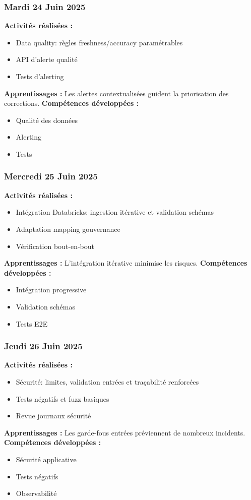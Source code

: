 \documentclass[12pt,a4paper]{article}
\begin{document}
\subsubsection{Mardi 24 Juin 2025}
\textbf{Activités réalisées :}
\begin{itemize}
    \item Data quality: règles freshness/accuracy paramétrables
    \item API d'alerte qualité
    \item Tests d'alerting
\end{itemize}
\textbf{Apprentissages :} Les alertes contextualisées guident la priorisation des corrections.
\textbf{Compétences développées :}
\begin{itemize}
    \item Qualité des données
    \item Alerting
    \item Tests
\end{itemize}

\subsubsection{Mercredi 25 Juin 2025}
\textbf{Activités réalisées :}
\begin{itemize}
    \item Intégration Databricks: ingestion itérative et validation schémas
    \item Adaptation mapping gouvernance
    \item Vérification bout-en-bout
\end{itemize}
\textbf{Apprentissages :} L'intégration itérative minimise les risques.
\textbf{Compétences développées :}
\begin{itemize}
    \item Intégration progressive
    \item Validation schémas
    \item Tests E2E
\end{itemize}

\subsubsection{Jeudi 26 Juin 2025}
\textbf{Activités réalisées :}
\begin{itemize}
    \item Sécurité: limites, validation entrées et traçabilité renforcées
    \item Tests négatifs et fuzz basiques
    \item Revue journaux sécurité
\end{itemize}
\textbf{Apprentissages :} Les garde-fous entrées préviennent de nombreux incidents.
\textbf{Compétences développées :}
\begin{itemize}
    \item Sécurité applicative
    \item Tests négatifs
    \item Observabilité
\end{itemize}
\end{document}
